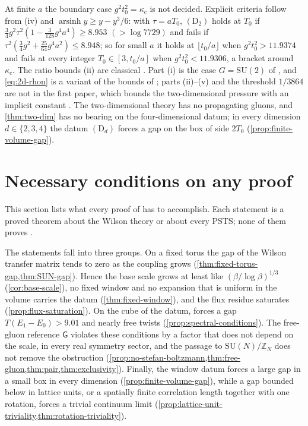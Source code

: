 \documentclass[11pt,a4paper]{amsart}
\theoremstyle{definition}
\theoremstyle{remark}
\numberwithin{equation}{section}
\newcommand{\Z}{\mathbb{Z}}          %
\newcommand{\SU}{\mathrm{SU}}              %
\newcommand{\PSTS}{\textup{PSTS}}          %
\newcommand{\Gharm}{\mathsf{G}}            %
\newcommand{\Mcirc}{\text{\upshape(M$^{\circ}$)}}   %
\newcommand{\tzero}{t_0}                   %
\newcommand{\Tzero}{T_0}                   %
\begin{document}
At finite $a$ the boundary case $g^2\tzero^2=\kappa_c$ is not decided. Explicit criteria follow from (iv) and $\operatorname{arsinh}y\ge y-y^3/6$: with $\tau=a\Tzero$, $(\mathrm D_2)$ holds at $\Tzero$ if $\frac34g^2\tau^2(1-\frac3{128}g^4a^4)\ge8.953$ $(>\log7729)$ and fails if $\tau^2(\frac34g^2+\frac{25}{64}g^4a^2)\le8.948$; so for small $a$ it holds at $\lfloor\tzero/a\rfloor$ when $g^2\tzero^2>11.9374$ and fails at every integer $\Tzero\in[3,\tzero/a]$ when $g^2\tzero^2<11.9306$, a bracket around $\kappa_c$. The ratio bounds (ii) are classical \cite{amos1974,segura2011}. Part (i) is the case $G=\SU(2)$ of \cite[Prop.~A5(i)]{bhattacharjee2026first}, and \eqref{eq:2d-rhon} is a variant of the bounds of \cite[Prop.~A5(ii)]{bhattacharjee2026first}; parts (ii)--(v) and the threshold $1/3864$ are not in the first paper, which bounds the two-dimensional pressure with an implicit constant \cite[Prop.~25]{bhattacharjee2026first}. The two-dimensional theory has no propagating gluons, and \cref{thm:two-dim} has no bearing on the four-dimensional datum; in every dimension $d\in\{2,3,4\}$ the datum $(\mathrm D_d)$ forces a gap on the box of side $2\Tzero$ (\cref{prop:finite-volume-gap}).
\section{Necessary conditions on any proof}\label{sec:necessary}

This section lists what every proof of \Mcirc{} has to accomplish. Each statement is a proved theorem about the Wilson theory or about every \PSTS; none of them proves \Mcirc.

The statements fall into three groups. On a fixed torus the gap of the Wilson transfer matrix tends to zero as the coupling grows (\cref{thm:fixed-torus-gap,thm:SUN-gap}). Hence the base scale grows at least like $(\beta/\log\beta)^{1/3}$ (\cref{cor:base-scale}), no fixed window and no expansion that is uniform in the volume carries the datum (\cref{thm:fixed-window}), and the flux residue saturates (\cref{prop:flux-saturation}). On the cube of the datum, \Mcirc{} forces a gap $T(E_1-E_0)>9.01$ and nearly free twists (\cref{prop:spectral-conditions}). The free-gluon reference $\Gharm$ violates these conditions by a factor that does not depend on the scale, in every real symmetry sector, and the passage to $\SU(N)/\Z_N$ does not remove the obstruction (\cref{prop:no-stefan-boltzmann,thm:free-gluon,thm:pair,thm:exclusivity}). Finally, the window datum forces a large gap in a small box in every dimension (\cref{prop:finite-volume-gap}), while a gap bounded below in lattice units, or a spatially finite correlation length together with one rotation, forces a trivial continuum limit (\cref{prop:lattice-unit-triviality,thm:rotation-triviality}).
\end{document}
